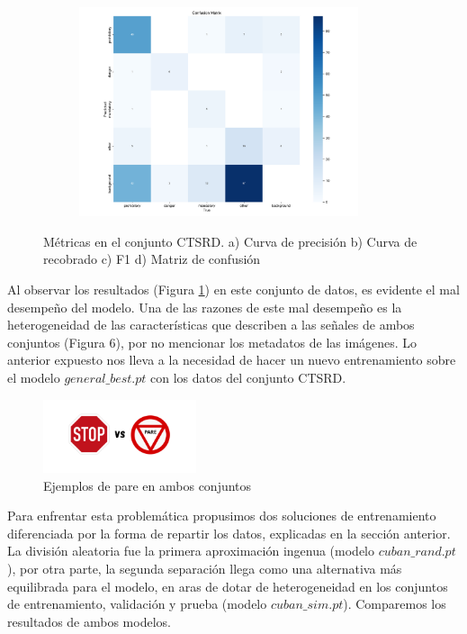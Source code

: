 \documentclass{article}
\begin{document}
\begin{figure}[h]
\begin{subfigure}[b]{0.5\textwidth}
\caption{}
\end{subfigure}
\begin{subfigure}[b]{0.5\textwidth}
\centering
\includegraphics[width=0.9\textwidth]{resources/cuban in general confusion matrix.png}
\caption{}
\end{subfigure}
\caption{Métricas en el conjunto CTSRD. a) Curva de precisión b) Curva de recobrado c) F1 d) Matriz de confusión}
\label{fig:results in cuban general}
\end{figure}

Al observar los resultados (Figura \ref{fig:results in cuban general}) en este conjunto de datos, es evidente el mal desempeño del modelo. Una de las razones de este mal desempeño es la heterogeneidad de las características que describen a las señales de ambos conjuntos (Figura 6), por no mencionar los metadatos de las imágenes. Lo anterior expuesto nos lleva a la necesidad de hacer un nuevo entrenamiento sobre el modelo $general\_best.pt$ con los datos del conjunto CTSRD.

\begin{figure}[h]
\centering
\includegraphics[width=0.4\textwidth]{resources/vs.png}
\caption{Ejemplos de pare en ambos conjuntos}
\label{fig:vs}
\end{figure}

Para enfrentar esta problemática propusimos dos soluciones de entrenamiento diferenciada por la forma de repartir los datos, explicadas en la sección anterior. La división aleatoria fue la primera aproximación ingenua (modelo $cuban\_rand.pt$), por otra parte, la segunda separación llega como una alternativa más equilibrada para el modelo, en aras de dotar de heterogeneidad en los conjuntos de entrenamiento, validación y prueba (modelo $cuban\_sim.pt$). Comparemos los resultados de ambos modelos.
\end{document}

